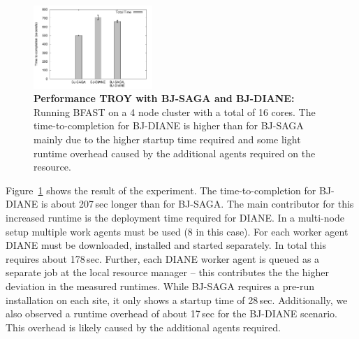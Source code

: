 \documentclass[conference,final]{IEEEtran}
\newcommand{\smnote}[1]{ {\textcolor{green} { ***sharath: #1 }}}
\newcommand{\smnote}[1]{}
\newcommand{\upp}{\vspace*{-0.5em}}
\begin{document}


\begin{figure}[t]
	\centering
		\includegraphics[width=0.4\textwidth]{perf/perf-bfast-bj.pdf}
	\caption{\textbf{Performance TROY with BJ-SAGA and BJ-DIANE:} Running BFAST 
	on a 4 node cluster with a total of 16 cores. The time-to-completion for 
	BJ-DIANE is higher than for BJ-SAGA mainly due to the higher startup 
	time required and some light runtime overhead caused by the additional 
	agents required on the resource.\upp \upp}
	\label{fig:perf_perf-bfast-bj}
\end{figure}



Figure~\ref{fig:perf_perf-bfast-bj} shows the result of the
experiment. The time-to-completion for BJ-DIANE is about 207\,sec
longer than for BJ-SAGA. The main contributor for this increased
runtime is the deployment time required for DIANE. In a multi-node
setup multiple work agents must be used (8 in this case).  For each
worker agent DIANE must be downloaded, installed and started
separately. In total this requires about 178\,sec. Further, each DIANE
worker agent is queued as a separate job at the local resource manager
-- this contributes the the higher deviation in the measured
runtimes. While BJ-SAGA requires a pre-run installation on each site,
it only shows a startup time of 28\,sec. Additionally, we also
observed a runtime overhead of about 17\,sec for the BJ-DIANE
scenario. This overhead is likely caused by the additional agents
required.
\end{document}
